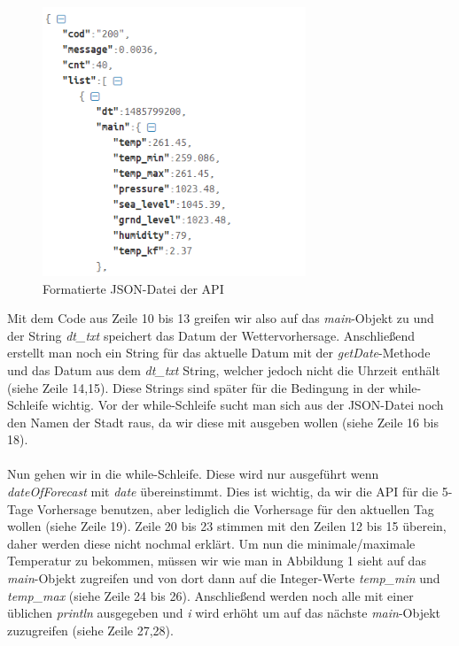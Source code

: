 \begin{figure}[htbp]
\begin{center}
\includegraphics[width=0.7\textwidth]{Bild1}
\caption{Formatierte JSON-Datei der API}
\end{center}
\end{figure}

Mit dem Code aus Zeile 10 bis 13 greifen wir also auf das \textit{main}-Objekt zu und der String \textit{dt\_txt} speichert das Datum der Wettervorhersage. Anschließend erstellt man noch ein String für das aktuelle Datum mit der \textit{getDate}-Methode und das Datum aus dem \textit{dt\_txt} String, welcher jedoch nicht die Uhrzeit enthält (siehe Zeile 14,15). Diese Strings sind später für die Bedingung in der while-Schleife wichtig. Vor der while-Schleife sucht man sich aus der JSON-Datei noch den Namen der Stadt raus, da wir diese mit ausgeben wollen (siehe Zeile 16 bis 18).\cite{[3]} \\
\\
Nun gehen wir in die while-Schleife. Diese wird nur ausgeführt wenn \textit{dateOfForecast} mit \textit{date} übereinstimmt. Dies ist wichtig, da wir die API für die 5-Tage Vorhersage benutzen, aber lediglich die Vorhersage für den aktuellen Tag wollen (siehe Zeile 19). Zeile 20 bis 23 stimmen mit den Zeilen 12 bis 15 überein, daher werden diese nicht nochmal erklärt. Um nun die minimale/maximale Temperatur zu bekommen, müssen wir wie man in Abbildung 1 sieht auf das \textit{main}-Objekt zugreifen und von dort dann auf die Integer-Werte \textit{temp\_min} und  \textit{temp\_max} (siehe Zeile 24 bis 26). Anschließend werden noch alle mit einer üblichen \textit{println} ausgegeben und \textit{i} wird erhöht um auf das nächste \textit{main}-Objekt zuzugreifen (siehe Zeile 27,28).


